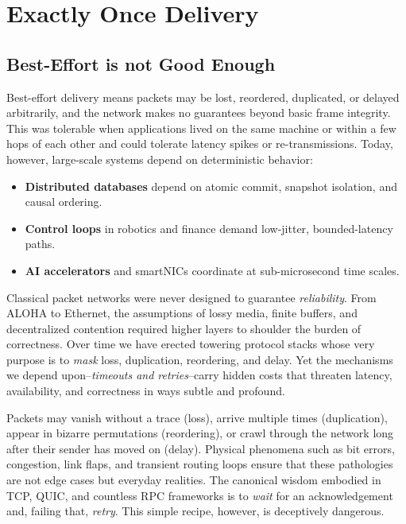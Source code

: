 \documentclass[../OAE-SPEC-MAIN.tex]{subfiles}
\begin{document}
\section{Exactly Once Delivery}

\subsection*{Best-Effort is not Good Enough}

Best-effort delivery means packets may be lost, reordered, duplicated, or delayed arbitrarily, and the network makes no guarantees beyond basic frame integrity. This was tolerable when applications lived on the same machine or within a few hops of each other and could tolerate latency spikes or re-transmissions. Today, however, large-scale systems depend on deterministic behavior:
\begin{itemize}
	\item \textbf{Distributed databases} depend on atomic commit, snapshot isolation, and causal ordering.
	\item \textbf{Control loops} in robotics and finance demand low-jitter, bounded-latency paths.
	\item \textbf{AI accelerators} and smartNICs coordinate at sub-microsecond time scales.
\end{itemize}
\vspace{1em}

Classical packet networks were never designed to guarantee \emph{reliability}.  From ALOHA to Ethernet, the assumptions of lossy media, finite buffers, and decentralized contention required higher layers to shoulder the burden of correctness.  Over time we have erected towering protocol stacks whose very purpose is to \emph{mask} loss, duplication, reordering, and delay.  Yet the mechanisms we depend upon--\textit{timeouts and retries}--carry hidden costs that threaten latency, availability, and correctness in ways subtle and profound.

Packets may vanish without a trace (loss), arrive multiple times (duplication), appear in bizarre permutations (reordering), or crawl through the network long after their sender has moved on (delay).  Physical phenomena such as bit errors, congestion, link flaps, and transient routing loops ensure that these pathologies are not edge cases but everyday realities.  The canonical wisdom \textemdash embodied in TCP, QUIC, and countless RPC frameworks \textemdash is to \emph{wait} for an acknowledgement and, failing that, \emph{retry}.  This simple recipe, however, is deceptively dangerous.
\end{document}
